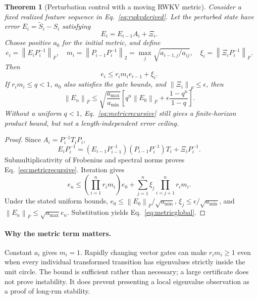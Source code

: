 \documentclass{article}
\newtheorem{theorem}{Theorem}[section]
\theoremstyle{remark}\newtheorem{remark}[theorem]{Remark}
\newcommand{\norm}[1]{\left\lVert #1\right\rVert}
\begin{document}
\begin{theorem}[Perturbation control with a moving RWKV metric]
\label{thm:metric}
Consider a fixed realized feature sequence in Eq.~\eqref{eq:rwkvderived}. Let the perturbed state have error $E_i=\widetilde S_i-S_i$ satisfying
\begin{equation}
 E_i=E_{i-1}A_i+\Xi_i.
\end{equation}
Choose positive $a_0$ for the initial metric, and define
\begin{equation}
 e_i=\norm{E_iP_i^{-1}}_F,\quad
 m_i=\norm{P_{i-1}P_i^{-1}}_2
 =\max_j\sqrt{a_{i-1,j}/a_{ij}},\quad
 \xi_i=\norm{\Xi_iP_i^{-1}}_F.
\end{equation}
Then
\begin{equation}
 e_i\le r_i m_i e_{i-1}+\xi_i.
 \label{eq:metricrecursive}
\end{equation}
If $r_i m_i\le q<1$, $a_0$ also satisfies the gate bounds, and $\norm{\Xi_i}_F\le\epsilon$, then
\begin{equation}
 \norm{E_n}_F\le
 \sqrt{\frac{a_{\max}}{a_{\min}}}
 \left[q^n\norm{E_0}_F+\epsilon\frac{1-q^n}{1-q}\right].
 \label{eq:metricglobal}
\end{equation}
Without a uniform $q<1$, Eq.~\eqref{eq:metricrecursive} still gives a finite-horizon product bound, but not a length-independent error ceiling.
\end{theorem}
\begin{proof}
Since $A_i=P_i^{-1}T_iP_i$,
\begin{equation}
 E_iP_i^{-1}
 =(E_{i-1}P_{i-1}^{-1})(P_{i-1}P_i^{-1})T_i
 +\Xi_iP_i^{-1}.
\end{equation}
Submultiplicativity of Frobenius and spectral norms proves Eq.~\eqref{eq:metricrecursive}. Iteration gives
\begin{equation}
 e_n\le \left(\prod_{i=1}^{n}r_i m_i\right)e_0
 +\sum_{j=1}^{n}\xi_j\prod_{i=j+1}^{n}r_i m_i.
\end{equation}
Under the stated uniform bounds, $e_0\le\norm{E_0}_F/\sqrt{a_{\min}}$, $\xi_j\le\epsilon/\sqrt{a_{\min}}$, and $\norm{E_n}_F\le\sqrt{a_{\max}}e_n$. Substitution yields Eq.~\eqref{eq:metricglobal}.
\end{proof}

\paragraph{Why the metric term matters.}
Constant $a_i$ gives $m_i=1$. Rapidly changing vector gates can make $r_i m_i\ge1$ even when every individual transformed transition has eigenvalues strictly inside the unit circle. The bound is sufficient rather than necessary; a large certificate does not prove instability. It does prevent presenting a local eigenvalue observation as a proof of long-run stability.
\end{document}
